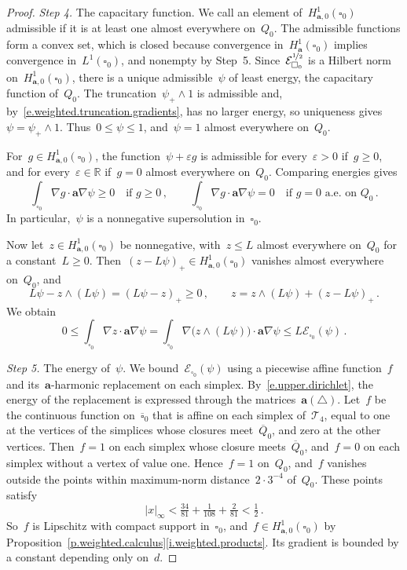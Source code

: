 \documentclass[11pt,letterpaper]{article}
\numberwithin{equation}{section}
\theoremstyle{definition}
\newcommand{\R}{\mathbb{R}}
\renewcommand{\a}{\mathbf{a}}
\newcommand{\eps}{\varepsilon}
\newcommand{\nf}{\nicefrac}
\newcommand{\cu}{\square}
\newcommand{\Ener}{\mathcal E}
\newcommand{\Hzero}[1]{H^1_{#1,0}}
\begin{document}
\begin{proof}
\smallskip

\emph{Step 4.} The capacitary function. We call an element of~$\Hzero{\a}(\cu_0)$ admissible if it is at least one almost everywhere on~$Q_0$. The admissible functions form a convex set, which is closed because convergence in~$H^1_\a(\cu_0)$ implies convergence in~$L^1(\cu_0)$, and nonempty by Step~5. Since~$\Ener_{\cu_0}^{\nf12}$ is a Hilbert norm on~$\Hzero{\a}(\cu_0)$, there is a unique admissible~$\psi$ of least energy, the capacitary function of~$Q_0$. The truncation~$\psi_+\wedge1$ is admissible and, by~\eqref{e.weighted.truncation.gradients}, has no larger energy, so uniqueness gives~$\psi=\psi_+\wedge1$. Thus~$0\leq\psi\leq1$, and~$\psi=1$ almost everywhere on~$Q_0$.

For~$g\in\Hzero{\a}(\cu_0)$, the function~$\psi+\eps g$ is admissible for every~$\eps>0$ if~$g\geq0$, and for every~$\eps\in\R$ if~$g=0$ almost everywhere on~$Q_0$. Comparing energies gives
\begin{equation*}
	\int_{\cu_0}\nabla g\cdot\a\nabla\psi\geq0\quad\mbox{if }g\geq0\,,\qquad\int_{\cu_0}\nabla g\cdot\a\nabla\psi=0\quad\mbox{if }g=0\mbox{ a.e. on }Q_0\,.
\end{equation*}
In particular,~$\psi$ is a nonnegative supersolution in~$\cu_0$.

Now let~$z\in\Hzero{\a}(\cu_0)$ be nonnegative, with~$z\leq L$ almost everywhere on~$Q_0$ for a constant~$L\geq0$. Then~$(z-L\psi)_+\in\Hzero{\a}(\cu_0)$ vanishes almost everywhere on~$Q_0$, and
\begin{equation*}
	L\psi-z\wedge(L\psi)=(L\psi-z)_+\geq0\,,\qquad z=z\wedge(L\psi)+(z-L\psi)_+\,.
\end{equation*}
We obtain
\begin{equation}
	0\leq\int_{\cu_0}\nabla z\cdot\a\nabla\psi=\int_{\cu_0}\nabla\bigl(z\wedge(L\psi)\bigr)\cdot\a\nabla\psi\leq L\Ener_{\cu_0}(\psi)\,.
	\label{e.capacitary.test}
\end{equation}

\smallskip

\emph{Step 5.} The energy of~$\psi$. We bound~$\Ener_{\cu_0}(\psi)$ using a piecewise affine function~$f$ and its~$\a$-harmonic replacement on each simplex. By~\eqref{e.upper.dirichlet}, the energy of the replacement is expressed through the matrices~$\a(\triangle)$. Let~$f$ be the continuous function on~$\overline{\cu}_0$ that is affine on each simplex of~$\mathscr T_4$, equal to one at the vertices of the simplices whose closures meet~$\overline Q_0$, and zero at the other vertices. Then~$f=1$ on each simplex whose closure meets~$\overline Q_0$, and~$f=0$ on each simplex without a vertex of value one. Hence~$f=1$ on~$Q_0$, and~$f$ vanishes outside the points within maximum-norm distance~$2\cdot3^{-4}$ of~$Q_0$. These points satisfy
\begin{equation*}
	|x|_\infty<\tfrac{34}{81}+\tfrac1{108}+\tfrac2{81}<\tfrac12\,.
\end{equation*}
So~$f$ is Lipschitz with compact support in~$\cu_0$, and~$f\in\Hzero{\a}(\cu_0)$ by Proposition~\ref{p.weighted.calculus}\ref{i.weighted.products}. Its gradient is bounded by a constant depending only on~$d$.


\end{proof}
\end{document}
